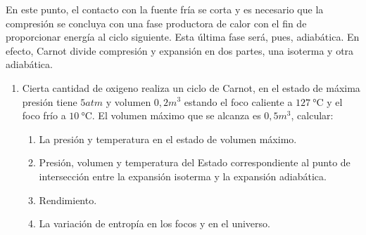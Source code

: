 \documentclass[../main]{subfiles}
\begin{document}
En este punto, el contacto con la fuente fría se corta y es necesario que la compresión se concluya con una fase productora de calor con el fin de proporcionar energía al ciclo siguiente. Esta última fase será, pues, adiabática. En efecto, Carnot divide compresión y ex­pansión en dos partes, una isoter­ma y otra adiabática.

\begin{enumerate}
    \item Cierta cantidad de oxigeno realiza un ciclo de Carnot, en el estado de máxima presión tiene $5 atm$ y volumen $0,2 m^{3}$ estando el foco caliente a $\SI{127}{\celsius}$ y el foco frío a $\SI{10}{\celsius}$. El volumen máximo que se alcanza es $0,5m^{3}$, calcular:
    \begin{enumerate}
        \item La presión y temperatura en el estado de volumen máximo.
\item Presión, volumen y temperatura del Estado correspondiente al punto de intersección entre la expansión isoterma y la expansión adiabática.
\item Rendimiento.
\item La variación de entropía en los focos y en el universo.
    \end{enumerate}
\end{enumerate}
\end{document}
